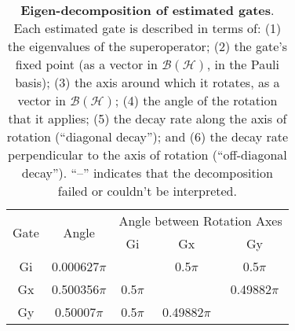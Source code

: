 {\begin{table}[h]
\begin{center}
\vspace{2em}
\begin{tabular}[l]{|c|c|c|c|c|}
\hline
\multirow{2}{*}{Gate} & \multirow{2}{*}{Angle} & \multicolumn{3}{c|}{Angle between Rotation Axes} \\ \cline{3-5}
 & & Gi & Gx & Gy \\ \hline
Gi & 0.000627$\pi$ &  & 0.5$\pi$ & 0.5$\pi$ \\ \hline
Gx & 0.500356$\pi$ & 0.5$\pi$ &  & 0.49882$\pi$ \\ \hline
Gy & 0.50007$\pi$ & 0.5$\pi$ & 0.49882$\pi$ &  \\ \hline
\end{tabular}

\caption{\textbf{Eigen-decomposition of estimated gates}.  Each estimated gate is described in terms of: (1) the eigenvalues of the superoperator; (2) the gate's fixed point (as a vector in $\mathcal{B}(\mathcal{H})$, in the Pauli basis); (3)  the axis around which it rotates, as a vector in $\mathcal{B}(\mathcal{H})$; (4) the angle of the rotation that it applies; (5) the decay rate along the axis of rotation (``diagonal decay''); and (6) the decay rate perpendicular to the axis of rotation (``off-diagonal decay'').  ``--'' indicates that the decomposition failed or couldn't be interpreted. \label{bestCPTPGatesetDecompTable}}
\end{center}
\end{table}


}
